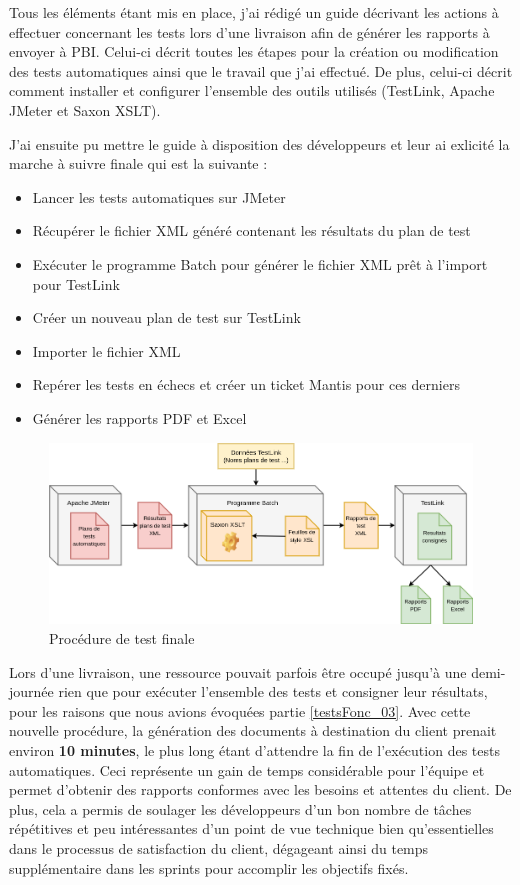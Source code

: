 	Tous les éléments étant mis en place, j'ai rédigé un guide décrivant les actions à effectuer concernant les tests lors d'une livraison afin de générer les rapports à envoyer à PBI. Celui-ci décrit toutes les étapes pour la création ou modification des tests automatiques ainsi que le travail que j'ai effectué. De plus, celui-ci décrit comment installer et configurer l'ensemble des outils utilisés (TestLink, Apache JMeter et Saxon XSLT).
	
J'ai ensuite pu mettre le guide à disposition des développeurs et leur ai exlicité la marche à suivre finale qui est la suivante :
	\begin{itemize}
		\item Lancer les tests automatiques sur JMeter
		\item Récupérer le fichier XML généré contenant les résultats du plan de test
		\item Exécuter le programme Batch pour générer le fichier XML prêt à l'import pour TestLink
		\item Créer un nouveau plan de test sur TestLink
		\item Importer le fichier XML
		\item Repérer les tests en échecs et créer un ticket Mantis pour ces derniers
		\item Générer les rapports PDF et Excel \\
	\end{itemize}

\begin{figure}[h!]
	\includegraphics[scale=0.5]{images/travailNeuflizeOBC/testsFonc/testsProcedure.png}
	\centering
	\caption{Procédure de test finale}
	\label{testsProcedure}
\end{figure}

	Lors d'une livraison, une ressource pouvait parfois être occupé jusqu'à une demi-journée rien que pour exécuter l'ensemble des tests et consigner leur résultats, pour les raisons que nous avions évoquées partie \ref{testsFonc_03}. Avec cette nouvelle procédure, la génération des documents à destination du client prenait environ \textbf{10 minutes}, le plus long étant d'attendre la fin de l'exécution des tests automatiques. Ceci représente un gain de temps considérable pour l'équipe et permet d'obtenir des rapports conformes avec les besoins et attentes du client. De plus, cela a permis de soulager les développeurs d'un bon nombre de tâches répétitives et peu intéressantes d'un point de vue technique bien qu'essentielles dans le processus de satisfaction du client, dégageant ainsi du temps supplémentaire dans les sprints pour accomplir les objectifs fixés. \\
	
